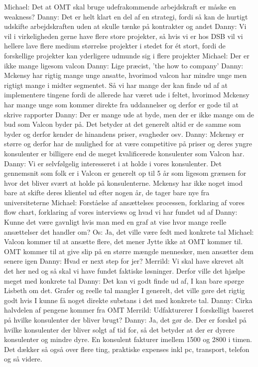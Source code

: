 Michael: Det at OMT skal bruge udefrakommende arbejdskraft er måske en weakness?
Danny: Det er helt klart en del af en strategi, fordi så kan de hurtigt udskifte arbejdskraften uden at skulle tænke på kontrakter og andet
Danny: Vi vil i virkeligheden gerne have flere store projekter, så hvis vi er hos DSB vil vi hellere lave flere medium størrelse projekter i stedet for ét stort, fordi de forskellige projekter kan yderligere udmunde sig i flere projekter
Michael: Der er ikke mange ligesom valcon
Danny: Lige præcist, 'the how to company'
Danny: Mckensy har rigtig mange unge ansatte, hvorimod valcon har mindre unge men rigtigt mange i midter segmentet. Så vi har mange der kan finde ud af at implementere tingene fordi de allerede har været ude i feltet, hvorimod Mckensy har mange unge som kommer direkte fra uddannelser og derfor er gode til at skrive rapporter
Danny: Der er mange ude at byde, men der er ikke mange om de bud som Valcon byder på. Det betyder at det generelt altid er de samme som byder og derfor kender de hinandens priser, svagheder osv.
Danny: Mckensy er større og derfor har de mulighed for at være competitive på priser og deres yngre konsulenter er billigere end de meget kvalificerede konsulenter som Valcon har.
Danny: Vi er selvfølgelig interesseret i at holde i vores konsulenter. Det gennemsnit som folk er i Valcon er generelt op til 5 år som ligesom grænsen for hvor det bliver svært at holde på konsulenterne. Mckensy har ikke noget imod bare at skifte deres klientel ud efter nogen år, de tager bare nye fra universiteterne
Michael: Forståelse af ansættelses processen, forklaring af vores flow chart, forklaring af vores interviews og hvad vi har fundet ud af
Danny: Kunne det være gavnligt hvis man med en graf at vise hvor mange reelle ansættelser det handler om?
Os: Ja, det ville være fedt med konkrete tal
Michael: Valcon kommer til at ansætte flere, det mener Jytte ikke at OMT kommer til. OMT kommer til at give slip på en større mængde mennesker, men ansætter dem senere igen
Danny: Hvad er next step for jer?
Merrild: Vi skal have skrevet alt det her ned og så skal vi have fundet faktiske løsninger. Derfor ville det hjælpe meget med konkrete tal
Danny: Det kan vi godt finde ud af, I kan bare spørge Lisbeth om det. Grafer og reelle tal mangler I generelt, det ville gøre det rigtig godt hvis I kunne få noget direkte substans i det med konkrete tal.
Danny: Cirka halvdelen af pengene kommer fra OMT
Merrild: Udfakturerer I forskelligt baseret på hvilke konsulenter der bliver brugt?
Danny: Ja, det gør de. Der er forskel på hvilke konsulenter der bliver solgt af tid for, så det betyder at der er dyrere konsulenter og mindre dyre. En konsulent fakturer imellem 1500 og 2800 i timen. Det dækker så også over flere ting, praktiske expenses inkl pc, transport, telefon og så videre.

